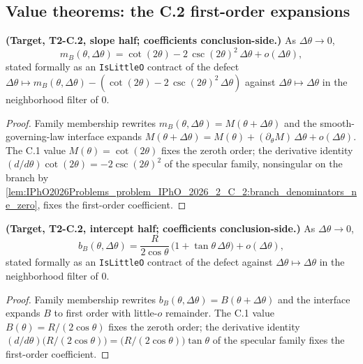 \subsection*{Value theorems: the C.2 first-order expansions}

\begin{theorem}
\label{thm:IPhO2026Problems_problem_IPhO_2026_2_C_2:ray_B_slope_first_order}
\textbf{(Target, T2-C.2, slope half; coefficients conclusion-side.)}  As
$\Delta\theta \to 0$,
\[
m_B(\theta, \Delta\theta)
= \cot (2\theta) - 2\,\csc(2\theta)^{2}\,\Delta\theta + o(\Delta\theta) ,
\]
stated formally as an \texttt{IsLittleO} contract of the defect
$\Delta\theta \mapsto m_B(\theta,\Delta\theta) -
(\cot(2\theta) - 2\,\csc(2\theta)^2\,\Delta\theta)$ against
$\Delta\theta \mapsto \Delta\theta$ in the neighborhood filter of $0$.
\end{theorem}
\begin{proof}
Family membership rewrites $m_B(\theta,\Delta\theta) = M(\theta+\Delta\theta)$
and the smooth-governing-law interface expands
$M(\theta+\Delta\theta) = M(\theta) + (\partial_\theta M)\,\Delta\theta
+ o(\Delta\theta)$.  The C.1 value $M(\theta) = \cot(2\theta)$ fixes the
zeroth order; the derivative identity
$(d/d\theta)\cot(2\theta) = -2\csc(2\theta)^2$ of the specular family,
nonsingular on the branch by
\cref{lem:IPhO2026Problems_problem_IPhO_2026_2_C_2:branch_denominators_ne_zero},
fixes the first-order coefficient.
\end{proof}

\begin{theorem}
\label{thm:IPhO2026Problems_problem_IPhO_2026_2_C_2:ray_B_intercept_first_order}
\textbf{(Target, T2-C.2, intercept half; coefficients conclusion-side.)}
As $\Delta\theta \to 0$,
\[
b_B(\theta, \Delta\theta)
= \frac{R}{2\cos\theta}\,\bigl(1 + \tan\theta\,\Delta\theta\bigr)
+ o(\Delta\theta) ,
\]
stated formally as an \texttt{IsLittleO} contract of the defect against
$\Delta\theta \mapsto \Delta\theta$ in the neighborhood filter of $0$.
\end{theorem}
\begin{proof}
Family membership rewrites $b_B(\theta,\Delta\theta) = B(\theta+\Delta\theta)$
and the interface expands $B$ to first order with little-$o$ remainder.
The C.1 value $B(\theta) = R/(2\cos\theta)$ fixes the zeroth order; the
derivative identity
$(d/d\theta)\bigl(R/(2\cos\theta)\bigr)
= \bigl(R/(2\cos\theta)\bigr)\tan\theta$ of the specular family fixes the
first-order coefficient.
\end{proof}

